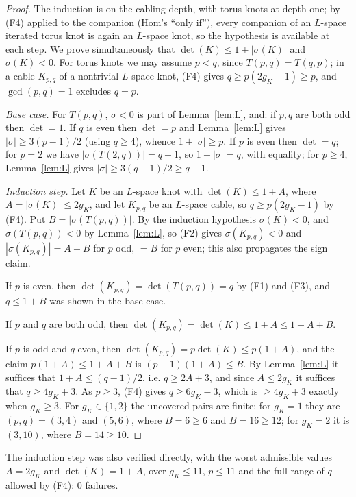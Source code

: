 \documentclass[11pt]{article}
\theoremstyle{definition}
\begin{document}
\begin{proof}
The induction is on the cabling depth, with torus knots at depth one; by (F4) applied to the companion (Hom's
``only if''), every companion of an $L$-space iterated torus knot is again an $L$-space knot, so the hypothesis is
available at each step. We prove simultaneously that $\det(K) \le 1 + |\sigma(K)|$ and $\sigma(K) < 0$. For torus knots
we may assume $p < q$, since $T(p,q) = T(q,p)$; in a cable $K_{p,q}$ of a nontrivial $L$-space knot, (F4) gives
$q \ge p(2g_K - 1) \ge p$, and $\gcd(p,q) = 1$ excludes $q = p$.

\emph{Base case.} For $T(p,q)$, $\sigma < 0$ is part of Lemma~\ref{lem:L}, and: if $p,q$ are both odd then $\det = 1$. If $q$ is even then $\det = p$ and
Lemma~\ref{lem:L} gives $|\sigma| \ge 3(p-1)/2$ (using $q \ge 4$), whence $1 + |\sigma| \ge p$. If $p$ is even then
$\det = q$; for $p = 2$ we have $|\sigma(T(2,q))| = q-1$, so $1 + |\sigma| = q$, with equality; for $p \ge 4$,
Lemma~\ref{lem:L} gives $|\sigma| \ge 3(q-1)/2 \ge q-1$.

\emph{Induction step.} Let $K$ be an $L$-space knot with $\det(K) \le 1 + A$, where $A = |\sigma(K)| \le 2g_K$, and let
$K_{p,q}$ be an $L$-space cable, so $q \ge p(2g_K-1)$ by (F4). Put $B = |\sigma(T(p,q))|$. By the induction hypothesis $\sigma(K) < 0$, and
$\sigma(T(p,q)) < 0$ by Lemma~\ref{lem:L}, so (F2) gives $\sigma(K_{p,q}) < 0$ and $|\sigma(K_{p,q})| = A + B$ for $p$
odd, $= B$ for $p$ even; this also propagates the sign claim.

If $p$ is even, then $\det(K_{p,q}) = \det(T(p,q)) = q$ by (F1) and (F3), and $q \le 1 + B$ was shown in the base case.

If $p$ and $q$ are both odd, then $\det(K_{p,q}) = \det(K) \le 1 + A \le 1 + A + B$.

If $p$ is odd and $q$ even, then $\det(K_{p,q}) = p\det(K) \le p(1+A)$, and the claim $p(1+A) \le 1 + A + B$ is
$(p-1)(1+A) \le B$. By Lemma~\ref{lem:L} it suffices that $1 + A \le (q-1)/2$, i.e. $q \ge 2A+3$, and since
$A \le 2g_K$ it suffices that $q \ge 4g_K+3$. As $p \ge 3$, (F4) gives $q \ge 6g_K-3$, which is $\ge 4g_K+3$ exactly
when $g_K \ge 3$. For $g_K \in \{1,2\}$ the uncovered pairs are finite: for $g_K = 1$ they are $(p,q) = (3,4)$ and
$(5,6)$, where $B = 6 \ge 6$ and $B = 16 \ge 12$; for $g_K = 2$ it is $(3,10)$, where $B = 14 \ge 10$.
\end{proof}

\noindent The induction step was also verified directly, with the worst admissible values $A = 2g_K$ and
$\det(K) = 1+A$, over $g_K \le 11$, $p \le 11$ and the full range of $q$ allowed by (F4): 0 failures.
\end{document}
